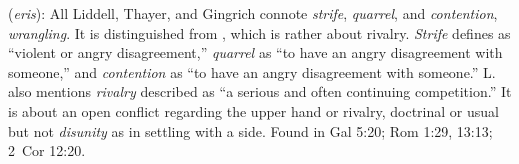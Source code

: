 \item[Quarrel,]

(\textit{eris}):
All Liddell, Thayer, and Gingrich connote \emph{strife}, \emph{quarrel}, and \emph{contention}, \emph{wrangling}.
It is distinguished from ,
which is rather about rivalry. \emph{Strife} defines as ``violent or angry disagreement,'' \emph{quarrel} as ``to have an angry disagreement with someone,'' and \emph{contention} as ``to have an angry disagreement with someone.'' L. also mentions \emph{rivalry} described as ``a serious and often continuing competition.'' It is about an open conflict regarding the upper hand or rivalry, doctrinal or usual but not \emph{disunity} as in settling with a side.
Found in Gal 5:20; Rom 1:29, 13:13; 2~Cor 12:20.
